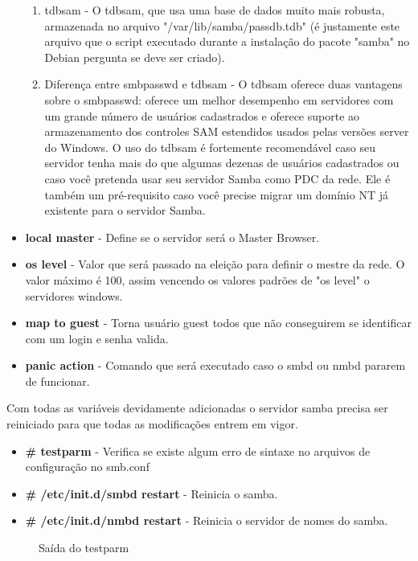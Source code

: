 \begin{itemize}
\begin{enumerate}
			\item{tdbsam} - O tdbsam, que usa uma base de dados muito mais robusta, armazenada no arquivo "/var/lib/samba/passdb.tdb" (é justamente este arquivo que o script executado durante a instalação do pacote "samba" no Debian pergunta se deve ser criado).\cite{BACKEND}
			\item{Diferença entre smbpasswd e tdbsam} - O tdbsam oferece duas vantagens sobre o smbpasswd: oferece um melhor desempenho em servidores com um grande número de usuários cadastrados e oferece suporte ao armazenamento dos controles SAM estendidos usados pelas versões server do Windows. O uso do tdbsam é fortemente recomendável caso seu servidor tenha mais do que algumas dezenas de usuários cadastrados ou caso você pretenda usar seu servidor Samba como PDC da rede. Ele é também um pré-requisito caso você precise migrar um domínio NT já existente para o servidor Samba. \cite{BACKEND}
		\end{enumerate}
	\item \textbf{local master} - Define se o servidor será o Master Browser.
	\item \textbf{os level} - Valor que será passado na eleição para definir o mestre da rede. O valor máximo é 100, assim vencendo os valores padrões de "os level" o servidores windows.
	\item \textbf{map to guest} - Torna usuário guest todos que não conseguirem se identificar com um login e senha valida.
	\item \textbf{panic action} - Comando que será executado caso o smbd ou nmbd pararem de funcionar.
\end{itemize}

Com todas as variáveis devidamente adicionadas o servidor samba precisa ser reiniciado para que todas as modificações entrem em vigor.

\begin{itemize}
	\item \textbf{\# testparm} - Verifica se existe algum erro de sintaxe no arquivos de configuração no smb.conf
	\item \textbf{\# /etc/init.d/smbd restart} - Reinicia o samba.
	\item \textbf{\# /etc/init.d/nmbd restart} - Reinicia o servidor de nomes do samba.
\end{itemize}

\begin{figure}[ht]
   	\centering
   	\caption{Saída do testparm}
    \label{testparm}
\end{figure}

